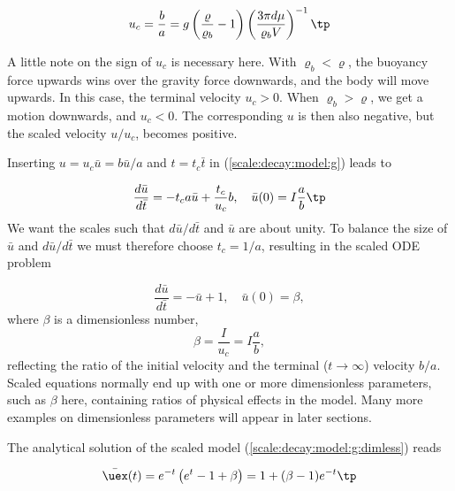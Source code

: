 \documentclass[graybox,envcountchap,sectrefs,final]{svmonodo}
\newenvironment{notice_mdfboxadmon}[1][]{
\begin{notice_mdfboxmdframed}[frametitle=#1]
}
{
\end{notice_mdfboxmdframed}
}
\begin{document}
\begin{equation}
u_c = \frac{b}{a} = g\left(\frac{\varrho}{\varrho_b} -1\right)\left(\frac{3\pi d\mu}{\varrho_b V}\right)^{-1}
\tp
\end{equation}


\begin{notice_mdfboxadmon}
A little note on the sign of $u_c$ is necessary here.
With $\varrho_b < \varrho$, the buoyancy force upwards wins over the
gravity force downwards, and the body will move upwards. In this case,
the terminal velocity $u_c > 0$. When $\varrho_b > \varrho$, we get
a motion downwards, and $u_c < 0$. The corresponding $u$ is then also
negative, but the scaled velocity $u/u_c$, becomes positive.
\end{notice_mdfboxadmon}




Inserting $u = u_c\bar u = b\bar u/a$ and $t=t_c\bar t$ in
(\ref{scale:decay:model:g}) leads to

\[
\frac{d\bar u}{d\bar t} = -t_c a\bar u + \frac{t_c}{u_c}b,
\quad \bar u(0) = I\frac{a}{b}
\tp
\]
We want the scales such that $d\bar u/d\bar t$ and $\bar u$ are
about unity.
To balance the size of $\bar u$ and $d\bar u/d\bar t$ we must
therefore choose
$t_c = 1/a$, resulting in the scaled ODE problem

\begin{equation}
\frac{d\bar u}{d\bar t} = -\bar u + 1,\quad \bar u(0)=\beta,
\label{scale:decay:model:g:dimless}
\end{equation}
where $\beta$ is a dimensionless number,
\begin{equation}
\beta = \frac{I}{u_c} = I\frac{a}{b},
\end{equation}
reflecting the ratio of the initial velocity and the
terminal ($t\rightarrow \infty$) velocity $b/a$.
Scaled equations normally end up with one or more dimensionless parameters,
such as $\beta$ here, containing ratios of physical effects in
the model. Many more examples on dimensionless parameters will appear
in later sections.

The analytical solution of the scaled model
(\ref{scale:decay:model:g:dimless}) reads

\begin{equation}
\bar\uex(t) =
e^{-t}\left( e^{t}-1 + \beta\right) = 1 + (\beta -1)e^{-t}\tp
\label{scale:decay:model:g:exact_scaled}
\end{equation}
\end{document}
